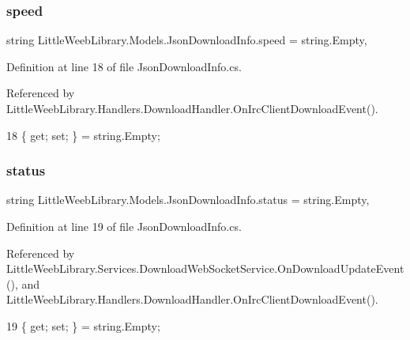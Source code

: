 \subsubsection{\texorpdfstring{speed}{speed}}
{\footnotesize\ttfamily string Little\+Weeb\+Library.\+Models.\+Json\+Download\+Info.\+speed = string.\+Empty\hspace{0.3cm}{\ttfamily [get]}, {\ttfamily [set]}}



Definition at line 18 of file Json\+Download\+Info.\+cs.



Referenced by Little\+Weeb\+Library.\+Handlers.\+Download\+Handler.\+On\+Irc\+Client\+Download\+Event().


\begin{DoxyCode}
18 \{ \textcolor{keyword}{get}; \textcolor{keyword}{set}; \} = \textcolor{keywordtype}{string}.Empty;
\end{DoxyCode}
\mbox{\label{class_little_weeb_library_1_1_models_1_1_json_download_info_ad948c6047f25fbd7f34cfdd53541ce5c}} 
\subsubsection{\texorpdfstring{status}{status}}
{\footnotesize\ttfamily string Little\+Weeb\+Library.\+Models.\+Json\+Download\+Info.\+status = string.\+Empty\hspace{0.3cm}{\ttfamily [get]}, {\ttfamily [set]}}



Definition at line 19 of file Json\+Download\+Info.\+cs.



Referenced by Little\+Weeb\+Library.\+Services.\+Download\+Web\+Socket\+Service.\+On\+Download\+Update\+Event(), and Little\+Weeb\+Library.\+Handlers.\+Download\+Handler.\+On\+Irc\+Client\+Download\+Event().


\begin{DoxyCode}
19 \{ \textcolor{keyword}{get}; \textcolor{keyword}{set}; \} = \textcolor{keywordtype}{string}.Empty;
\end{DoxyCode}
\mbox{\label{class_little_weeb_library_1_1_models_1_1_json_download_info_a1d7135715feead09b5ace2b3b67fce4a}} 
